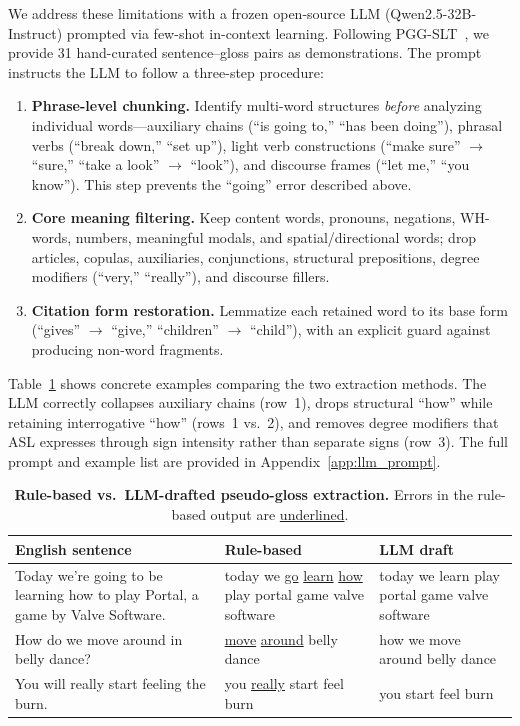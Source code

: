 \documentclass{article}
\begin{document}
We address these limitations with a frozen open-source LLM (Qwen2.5-32B-Instruct) prompted via few-shot in-context learning.
Following PGG-SLT~\citep{wong2025pgg}, we provide 31 hand-curated sentence--gloss pairs as demonstrations.
The prompt instructs the LLM to follow a three-step procedure:

\begin{enumerate}
    \item \textbf{Phrase-level chunking.} Identify multi-word structures \emph{before} analyzing individual words---auxiliary chains (``is going to,'' ``has been doing''), phrasal verbs (``break down,'' ``set up''), light verb constructions (``make sure'' $\to$ ``sure,'' ``take a look'' $\to$ ``look''), and discourse frames (``let me,'' ``you know'').
    This step prevents the ``going'' error described above.
    \item \textbf{Core meaning filtering.} Keep content words, pronouns, negations, WH-words, numbers, meaningful modals, and spatial/directional words; drop articles, copulas, auxiliaries, conjunctions, structural prepositions, degree modifiers (``very,'' ``really''), and discourse fillers.
    \item \textbf{Citation form restoration.} Lemmatize each retained word to its base form (``gives'' $\to$ ``give,'' ``children'' $\to$ ``child''), with an explicit guard against producing non-word fragments.
\end{enumerate}

Table~\ref{tab:gloss_examples} shows concrete examples comparing the two extraction methods.
The LLM correctly collapses auxiliary chains (row~1), drops structural ``how'' while retaining interrogative ``how'' (rows~1 vs.\ 2), and removes degree modifiers that ASL expresses through sign intensity rather than separate signs (row~3).
The full prompt and example list are provided in Appendix~\ref{app:llm_prompt}.

\begin{table}[h]
  \caption{\textbf{Rule-based vs.\ LLM-drafted pseudo-gloss extraction.} Errors in the rule-based output are \underline{underlined}.}
  \label{tab:gloss_examples}
  \centering
  \small
  \begin{tabular}{p{5.8cm}p{3.8cm}p{3.8cm}}
    \toprule
    \textbf{English sentence} & \textbf{Rule-based} & \textbf{LLM draft} \\
    \midrule
    Today we're going to be learning how to play Portal, a game by Valve Software.
      & today we \underline{go} \underline{learn} \underline{how} play portal game valve software
      & today we learn play portal game valve software \\[4pt]
    How do we move around in belly dance?
      & \underline{move} \underline{around} belly dance
      & how we move around belly dance \\[4pt]
    You will really start feeling the burn.
      & you \underline{really} start feel burn
      & you start feel burn \\
    \bottomrule
  \end{tabular}
\end{table}
\end{document}
